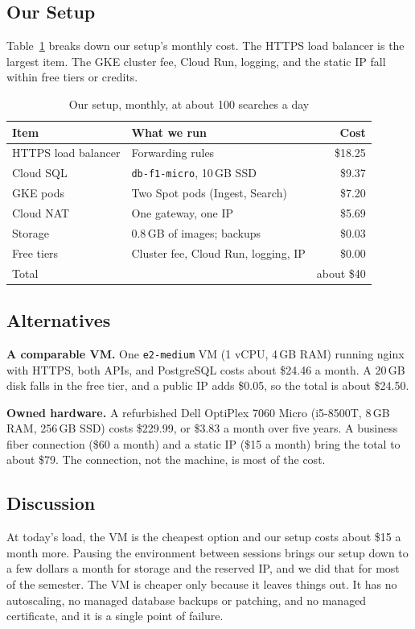 \documentclass[conference]{IEEEtran}
\begin{document}
\subsection{Our Setup}
Table~\ref{tab:cost-ours} breaks down our setup's monthly cost. The HTTPS
load balancer is the largest item. The GKE cluster fee, Cloud Run, logging,
and the static IP fall within free tiers or credits.

\begin{table}[!t]
\caption{Our setup, monthly, at about 100 searches a day}
\label{tab:cost-ours}
\centering\footnotesize
\begin{tabularx}{\columnwidth}{@{}lXr@{}}
\toprule
Item & What we run & Cost \\
\midrule
HTTPS load balancer & Forwarding rules & \$18.25 \\
Cloud SQL & \texttt{db-f1-micro}, 10\,GB SSD & \$9.37 \\
GKE pods & Two Spot pods (Ingest, Search) & \$7.20 \\
Cloud NAT & One gateway, one IP & \$5.69 \\
Storage & 0.8\,GB of images; backups & \$0.03 \\
Free tiers & Cluster fee, Cloud Run, logging, IP & \$0.00 \\
\midrule
Total & & about \$40 \\
\bottomrule
\end{tabularx}
\end{table}

\subsection{Alternatives}
\textbf{A comparable VM.} One \texttt{e2-medium} VM (1 vCPU, 4\,GB RAM)
running nginx with HTTPS, both APIs, and PostgreSQL costs about \$24.46 a
month. A 20\,GB disk falls in the free tier, and a public IP adds \$0.05,
so the total is about \$24.50.

\textbf{Owned hardware.} A refurbished Dell OptiPlex 7060 Micro (i5-8500T,
8\,GB RAM, 256\,GB SSD) costs \$229.99, or \$3.83 a month over five years.
A business fiber connection (\$60 a month) and a static IP (\$15 a month)
bring the total to about \$79. The connection, not the machine, is most of
the cost.

\subsection{Discussion}
At today's load, the VM is the cheapest option and our setup costs about
\$15 a month more. Pausing the environment between sessions brings our
setup down to a few dollars a month for storage and the reserved IP, and
we did that for most of the semester. The VM is cheaper only because it
leaves things out. It has no autoscaling, no managed database backups or
patching, and no managed certificate, and it is a single point of failure.
\end{document}
